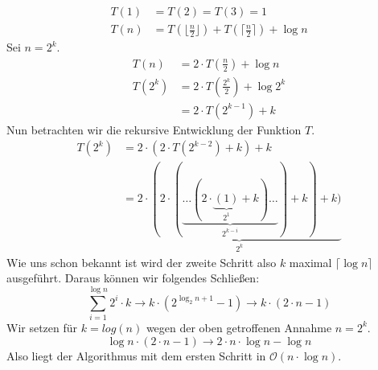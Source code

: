 \documentclass[a4paper]{article}
\begin{document}
\begin{equation}
\begin{split}
	T(1) &= T(2) = T(3) = 1  \\
	T(n) &= T(\lfloor \frac{n}{2} \rfloor) + T(\lceil \frac{n}{2} \rceil) + \log n
\end{split}
\end{equation}
Sei $n=2^k$.
\begin{equation}
\begin{split}
T(n)   &= 2 \cdot T(\frac{n}{2}) + \log n \\
T(2^k) &= 2 \cdot T(\frac{2^{k}}{2}) + \log 2^k \\
	   &= 2 \cdot T(2^{k-1}) + k 
\end{split}
\end{equation}
Nun betrachten wir die rekursive Entwicklung der Funktion $T$.
\begin{equation}
\begin{split}
T(2^k) &= 2 \cdot \left( 2 \cdot T(2^{k-2}) + k \right) + k \\
	 &= \underbrace{2 \cdot ( 2 \cdot ( \underbrace{\dots (2 \cdot \underbrace{(1)}_{2^{1}} + k) \dots}_{2^{k-i}}) + k) + k)}_{2^k} 
\end{split}
\end{equation}
Wie uns schon bekannt ist wird der zweite Schritt also $k$ maximal $\lceil \log n \rceil$ ausgeführt. Daraus können wir folgendes Schließen:
\begin{equation}
\sum_{i=1}^{\log n} 2^i \cdot k \rightarrow k \cdot (2^{\log_2 n + 1} - 1) \rightarrow k \cdot (2 \cdot n - 1)
\end{equation}
Wir setzen für $k = log(n)$ wegen der oben getroffenen Annahme $n = 2^k$.
\begin{equation}
\log n \cdot (2 \cdot n - 1) \rightarrow 2 \cdot n \cdot \log n - \log n
\end{equation}
Also liegt der Algorithmus mit dem ersten Schritt in $\mathcal{O}(n \cdot \log n)$.
\end{document}
